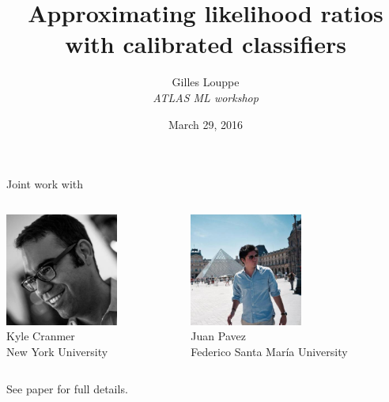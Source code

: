 \documentclass{beamer}
\title{{\bf Approximating likelihood ratios with calibrated classifiers}}
\author{
Gilles Louppe\\
{\it ATLAS ML workshop}
}
\date{March 29, 2016}
\let\oldcitep=\citep
\renewcommand\citep[1]{\hyperlink{#1}{\oldcitep{#1}}}
\begin{document}
\begin{frame}[plain]
\titlepage
\end{frame}

\begin{frame}
    \centering
    Joint work with
    \vspace{2em}

    \begin{columns}
      \begin{column}[t]{0.45\textwidth}
        \centering
        \includegraphics[height=10em]{figures/kyle.jpg}\\
        Kyle Cranmer\\
        {\scriptsize New York University}
      \end{column}
      \begin{column}[t]{0.45\textwidth}
          \centering
          \includegraphics[height=10em]{figures/juan.jpg}\\
          Juan Pavez\\
          {\scriptsize Federico Santa Mar\'ia University}
      \end{column}
    \end{columns}

    \vspace{2em}

    See paper \citep{cranmer2015approximating} for full details.
\end{frame}
\end{document}
